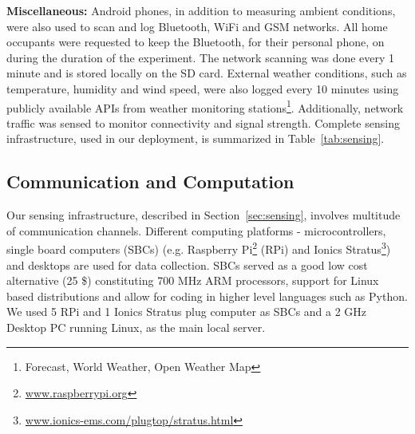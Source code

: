 \documentclass[10pt]{sensys-proc}
\newcommand{\secref}[1]{Section~\ref{#1}}
\newcommand{\tabref}[1]{Table~\ref{#1}}
\begin{document}
\noindent \textbf{Miscellaneous:} Android phones, in addition to measuring ambient conditions, were also used to scan and log Bluetooth, WiFi and GSM networks. All home occupants were requested to keep the Bluetooth, for their personal phone, on during the duration of the experiment. The network scanning was done every 1 minute and is stored locally on the SD card. External weather conditions, such as temperature, humidity and wind speed, were also logged every 10 minutes using publicly available APIs from weather monitoring stations\footnote{Forecast, World Weather, Open Weather Map}.
Additionally, network traffic was sensed to monitor connectivity and signal strength. %
Complete sensing infrastructure, used in our deployment, is summarized in \tabref{tab:sensing}.


\subsection{Communication and Computation}
Our sensing infrastructure, described in \secref{sec:sensing}, involves multitude of communication channels. Different computing platforms - microcontrollers, single board computers (SBCs) (e.g. Raspberry Pi\footnote{\url{www.raspberrypi.org}} (RPi) and Ionics Stratus\footnote{\url{www.ionics-ems.com/plugtop/stratus.html}}) and desktops are used for data collection.  
SBCs served as a good low cost alternative (25 \$) constituting 700 MHz ARM processors, support for Linux based distributions and allow for coding in higher level languages such as Python. %
We used 5 RPi and 1 Ionics Stratus plug computer as SBCs and a 2 GHz Desktop PC running Linux, as the main local server.
\end{document}
